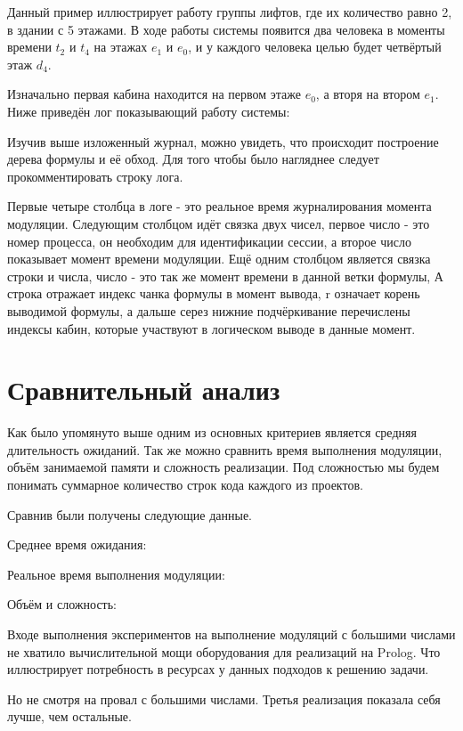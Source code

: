 	Данный пример иллюстрирует работу группы лифтов, где их количество равно 2, в здании с 5 этажами.
		В ходе работы системы появится два человека в моменты времени $t_2$ и $t_4$ на этажах $e_1$ и $e_0$,
		и у каждого человека целью будет четвёртый этаж $d_4$.

	Изначально первая кабина находится на первом этаже $e_0$, а вторя на втором $e_1$.
		Ниже приведён лог показывающий работу системы:


Изучив выше изложенный журнал, можно увидеть, что происходит построение дерева формулы и её обход.
	Для того чтобы было нагляднее следует прокомментировать строку лога.

Первые четыре столбца в логе - это реальное время журналирования момента модуляции.
	Следующим столбцом идёт связка двух чисел, первое число - это номер процесса,
	он необходим для идентификации сессии, а второе число показывает момент времени модуляции.
	Ещё одним столбцом является связка строки и числа, число - это так же момент времени в данной ветки формулы,
	А строка отражает индекс чанка формулы в момент вывода, r означает корень выводимой формулы, а дальше серез нижние подчёркивание перечислены индексы кабин, которые участвуют в логическом выводе в данные момент.

	\section{Сравнительный анализ}

	Как было упомянуто выше одним из основных критериев является средняя длительность ожиданий.
		Так же можно сравнить время выполнения модуляции, объём занимаемой памяти и сложность реализации.
		Под сложностью мы будем понимать суммарное количество строк кода каждого из проектов.

	Сравнив были получены следующие данные.

		Среднее время ожидания:

		Реальное время выполнения модуляции:

		Объём и сложность:

		Входе выполнения экспериментов на выполнение модуляций с большими числами не хватило вычислительной мощи
		оборудования для реализаций на Prolog. Что иллюстрирует потребность в ресурсах у данных подходов
		к решению задачи.

		Но не смотря на провал с большими числами. Третья реализация показала себя лучше, чем остальные.
